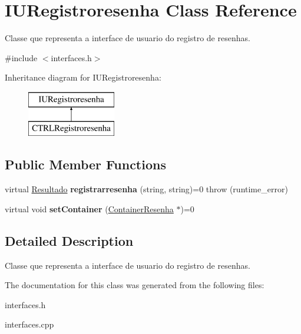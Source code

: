\hypertarget{classIURegistroresenha}{}\section{I\+U\+Registroresenha Class Reference}
\label{classIURegistroresenha}


Classe que representa a interface de usuario do registro de resenhas.  




{\ttfamily \#include $<$interfaces.\+h$>$}

Inheritance diagram for I\+U\+Registroresenha\+:\begin{figure}[H]
\begin{center}
\leavevmode
\includegraphics[height=2.000000cm]{classIURegistroresenha}
\end{center}
\end{figure}
\subsection*{Public Member Functions}
\begin{DoxyCompactItemize}
\item 
\mbox{\label{classIURegistroresenha_abd7a6fbc2756723d7b6dda91639251cf}} 
virtual \hyperlink{classResultado}{Resultado} {\bfseries registrarresenha} (string, string)=0  throw (runtime\+\_\+error)
\item 
\mbox{\label{classIURegistroresenha_afe8c0b46005d77a55a80b765daeb4bb7}} 
virtual void {\bfseries set\+Container} (\hyperlink{classContainerResenha}{Container\+Resenha} $\ast$)=0
\end{DoxyCompactItemize}


\subsection{Detailed Description}
Classe que representa a interface de usuario do registro de resenhas. 

The documentation for this class was generated from the following files\+:\begin{DoxyCompactItemize}
\item 
interfaces.\+h\item 
interfaces.\+cpp\end{DoxyCompactItemize}
